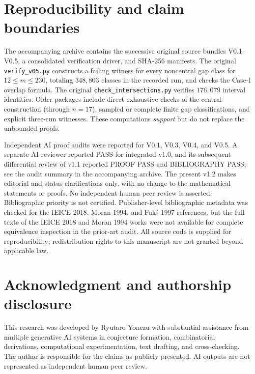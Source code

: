 \documentclass[11pt,a4paper]{article}
\begin{document}
\section{Reproducibility and claim boundaries}\label{app:repro}
The accompanying archive contains the successive original source bundles V0.1--V0.5, a consolidated verification driver, and SHA-256 manifests. The original \texttt{verify\_v05.py} constructs a failing witness for every noncentral gap class for $12\le m\le230$, totaling $348{,}803$ classes in the recorded run, and checks the Case-I overlap formula. The original \texttt{check\_intersections.py} verifies $176{,}079$ interval identities. Older packages include direct exhaustive checks of the central construction (through $n=17$), sampled or complete finite gap classifications, and explicit three-run witnesses. These computations \emph{support} but do not replace the unbounded proofs.

Independent AI proof audits were reported for V0.1, V0.3, V0.4, and V0.5. A separate AI reviewer reported PASS for integrated v1.0, and its subsequent differential review of v1.1 reported PROOF PASS and BIBLIOGRAPHY PASS; see the audit summary in the accompanying archive. The present v1.2 makes editorial and status clarifications only, with no change to the mathematical statements or proofs. No independent human peer review is asserted. Bibliographic priority is not certified. Publisher-level bibliographic metadata was checked for the IEICE 2018, Moran 1994, and Fuk\'s 1997 references, but the full texts of the IEICE 2018 and Moran 1994 works were not available for complete equivalence inspection in the prior-art audit. All source code is supplied for reproducibility; redistribution rights to this manuscript are not granted beyond applicable law.

\section*{Acknowledgment and authorship disclosure}
This research was developed by Ryutaro Yonezu with substantial assistance from multiple generative AI systems in conjecture formation, combinatorial derivations, computational experimentation, text drafting, and cross-checking. The author is responsible for the claims as publicly presented. AI outputs are not represented as independent human peer review.
\end{document}
